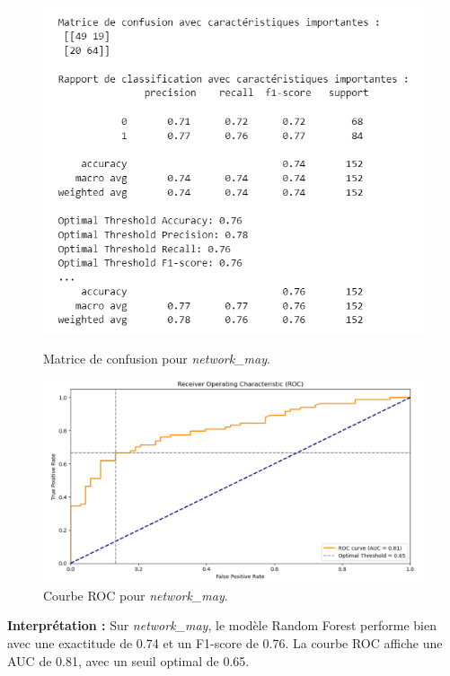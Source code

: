 \begin{figure}[H]
    \centering
    \begin{minipage}{0.45\linewidth}
        \centering
        \includegraphics[width=\linewidth]{capture_modele_11.png}
        \caption{Matrice de confusion pour \textit{network\_may}.}
    \end{minipage}
    \hfill
    \begin{minipage}{0.45\linewidth}
        \centering
        \includegraphics[width=\linewidth]{capture_modele_40.png}
        \caption{Courbe ROC pour \textit{network\_may}.}
        \label{fig:roc_may_rf}
    \end{minipage}
\end{figure}

\textbf{Interprétation :} Sur \textit{network\_may}, le modèle Random Forest performe bien avec une exactitude de 0.74 et un F1-score de 0.76. La courbe ROC affiche une AUC de 0.81, avec un seuil optimal de 0.65.

